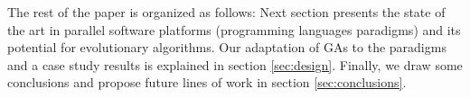 The rest of the paper is organized as follows: Next section
presents the state of the art in parallel software platforms (programming languages paradigms) and its potential for evolutionary algorithms. Our
adaptation of GAs to the paradigms and a case study results is
explained in section \ref{sec:design}. Finally, we draw some
conclusions and propose future lines of work in section
\ref{sec:conclusions}. 